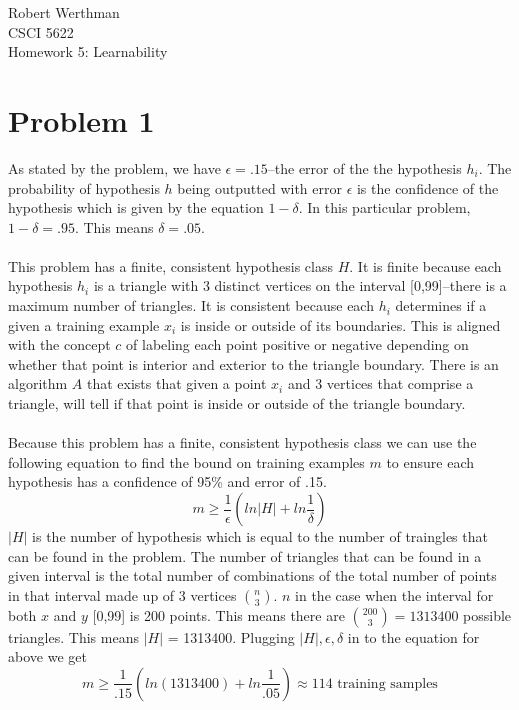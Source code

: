 \documentclass[12pt]{article}
\begin{document}
\noindent
Robert Werthman\\
CSCI 5622\\
Homework 5: Learnability\\

\section*{Problem 1}
As stated by the problem, we have $\epsilon = .15$--the error of the the hypothesis $h_i$.  The probability of hypothesis $h$ being outputted with error $\epsilon$ is the confidence of the hypothesis which is given by the equation $1 - \delta$.  In this particular problem, $1 - \delta = .95$.  This means $\delta = .05$.\\
\\
This problem has a finite, consistent hypothesis class $H$.  It is finite because each hypothesis $h_i$ is a triangle with 3 distinct vertices on the interval [0,99]--there is a maximum number of triangles.  It is consistent because each $h_i$ determines if a given a training example $x_i$ is inside or outside of its boundaries.  This is aligned with the concept $c$ of labeling each point positive or negative depending on whether that point is interior and exterior to the triangle boundary.  There is an algorithm $A$ that exists that given a point $x_i$ and 3 vertices that comprise a triangle, will tell if that point is inside or outside of the triangle boundary.\\
\\
Because this problem has a finite, consistent hypothesis class we can use the following equation to find the bound on training examples $m$ to ensure each hypothesis has a confidence of 95\% and error of .15.
\[
m \ge \frac{1}{\epsilon}(ln|H| + ln\frac{1}{\delta})
\]  
$|H|$ is the number of hypothesis which is equal to the number of traingles that can be found in the problem.  The number of triangles that can be found in a given interval is the total number of combinations of the total number of points in that interval made up of 3 vertices $\binom{n}{3}$.  $n$ in the case when the interval for both $x$ and $y$ [0,99] is 200 points.  This means there are $\binom{200}{3} = 1313400$ possible triangles.  This means $|H|$ = 1313400.  Plugging $|H|, \epsilon, \delta$ in to the equation for above we get
\[
m \ge \frac{1}{.15}(ln(1313400) + ln\frac{1}{.05}) \approx 114 \text{ training samples}
\]
\end{document}

